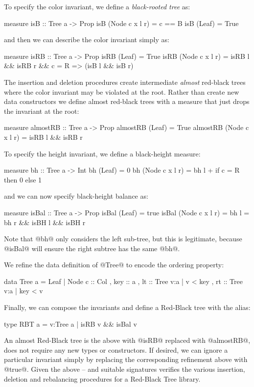 To specify the color invariant, we define a \emph{black-rooted tree} as:
%
\begin{code}
  measure isB           :: Tree a -> Prop 
    isB (Node c x l r)  = c == B
    isB (Leaf)          = True
\end{code}
%
and then we can describe the color invariant simply as:
%
\begin{code}
  measure isRB          :: Tree a -> Prop
    isRB (Leaf)         = True
    isRB (Node c x l r) = isRB l && isRB r &&
                          c = R => (isB l && isB r)
\end{code}
%
The insertion and deletion procedures create intermediate \emph{almost} 
red-black trees where the color invariant may be violated at the root. 
Rather than create new data constructors we define almost red-black 
trees with a measure that just drops the invariant at the root:
%
\begin{code}
  measure almostRB          :: Tree a -> Prop
    almostRB (Leaf)         = True
    almostRB (Node c x l r) = isRB l && isRB r
\end{code}

To specify the height invariant, we define a black-height measure:
%
\begin{code}
  measure bh          :: Tree a -> Int
    bh (Leaf)         = 0
    bh (Node c x l r) = bh l + if c = R then 0 else 1
\end{code}
%
and we can now specify black-height balance as:
%
\begin{code}
  measure isBal          :: Tree a -> Prop
    isBal (Leaf)         = true
    isBal (Node c x l r) = bh l = bh r 
                         && isBH l && isBH r 
\end{code}
%
Note that @bh@ only considers the left sub-tree, 
but this is legitimate, because @isBal@ will 
ensure the right subtree has the same @bh@.

We refine the data definition of @Tree@ 
to encode the ordering property:
%
\begin{code}
  data Tree a
    = Leaf
    | Node { c   :: Col
           , key :: a
           , lt  :: Tree {v:a | v < key }
           , rt  :: Tree {v:a | key < v } }
\end{code}
%

Finally, we can compose the invariants and define a 
Red-Black tree with the alias:
%
\begin{code}
  type RBT a = {v:Tree a | isRB v && isBal v}
\end{code}
%
An almost Red-Black tree is the above with @isRB@ 
replaced with @almostRB@, \ie does not require any 
new types or constructors.
If desired, we can ignore a particular invariant 
simply by replacing the corresponding refinement 
above with @true@.
Given the above -- and suitable signatures \toolname 
verifies the various insertion, deletion and rebalancing
procedures for a Red-Black Tree library.

